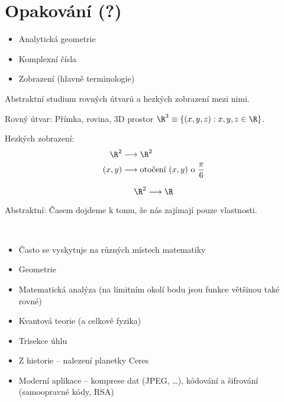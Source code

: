 \documentclass[12pt]{article}					%
\begin{document}
\section{Opakování (?)}
    \begin{itemize}
        \item Analytická geometrie
        \item Komplexní čísla
        \item Zobrazení (hlavně terminologie)
    \end{itemize}
    \begin{poznamka}
        Abstraktní studium rovných útvarů a hezkých zobrazení mezi nimi.

        Rovný útvar: Přímka, rovina, 3D prostor $\R^3 \equiv \{(x, y, z): x, y, z \in \R\}$.

        Hezkých zobrazení: 
        \begin{align}
            \R^2 & \longrightarrow \R^2 \\
            (x, y) & \longrightarrow \text{otočení }(x, y)\text{ o }\frac{\pi}{6}
        \end{align}

        $$ \R^2 \longrightarrow \R $$

        Abstraktní: Časem dojdeme k tomu, že nás zajímají pouze vlastnosti.
    \end{poznamka}
    \begin{poznamka}
        \ 
        \begin{itemize}
            \item Často se vyskytuje na různých místech matematiky
            \item Geometrie
            \item Matematická analýza (na limitním okolí bodu jsou funkce většinou také rovné)
            \item Kvantová teorie (a celkově fyzika)
            \item Trisekce úhlu
            \item Z historie -- nalezení planetky Ceres
            \item Moderní aplikace -- komprese dat (JPEG, …), kódování a šifrování (samoopravné kódy, RSA)
        \end{itemize}
        
    \end{poznamka}
\end{document}
